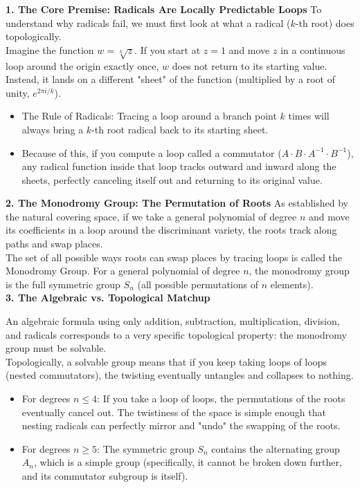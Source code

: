 {\bf 1. The Core Premise: Radicals Are Locally Predictable Loops}
To understand why radicals fail, we must first look at what a radical (\(k\)-th root) does topologically. \\ 
Imagine the function \(w = \sqrt[k]{z}\). If you start at \(z=1\) and move \(z\) in a continuous loop around the origin exactly once, \(w\) does not return to its starting value. 
Instead, it lands on a different "sheet" of the function (multiplied by a root of unity, \(e^{2\pi i/k}\)).

\begin{itemize}
\item[]The Rule of Radicals: Tracing a loop around a branch point \(k\) times will always bring a \(k\)-th root radical back to its starting sheet.
\item[]Because of this, if you compute a loop called a commutator (\(A \cdot B \cdot A^{-1} \cdot B^{-1}\)), any radical function inside that loop tracks outward and inward along the sheets, perfectly canceling itself out and returning to its original value.
\end{itemize}

{\bf 2. The Monodromy Group: The Permutation of Roots}
As established by the natural covering space, if we take a general polynomial of degree \(n\) and move its coefficients in a loop around the discriminant variety, the roots track along paths and swap places.\\

The set of all possible ways roots can swap places by tracing loops is called the Monodromy Group. For a general polynomial of degree \(n\), the monodromy group is the full symmetric group \(S_{n}\) (all possible permutations of \(n\) elements).\\

{\bf 3. The Algebraic vs. Topological Matchup}

An algebraic formula using only addition, subtraction, multiplication, division, and radicals corresponds to a very specific topological property: the monodromy group must be solvable.\\ 
Topologically, a solvable group means that if you keep taking loops of loops (nested commutators), the twisting eventually untangles and collapses to nothing.
\begin{itemize}
\item[]For degrees \(n \le 4\): If you take a loop of loops, the permutations of the roots eventually cancel out. 
The twistiness of the space is simple enough that nesting radicals can perfectly mirror and "undo" the swapping of the roots.
\item[]For degrees \(n \ge 5\): The symmetric group \(S_{n}\) contains the alternating group \(A_{n}\), which is a simple group (specifically, 
it cannot be broken down further, and its commutator subgroup is itself).
\end{itemize}

